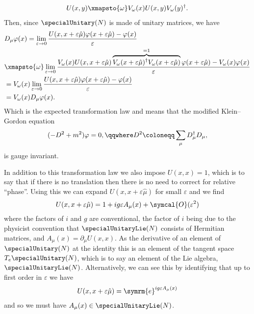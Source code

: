 \documentclass[fleqn]{NotesClass}
\newcommand{\e}{\symrm{e}}
\newcommand{\covariantDerivative}{D}
\newcommand{\hermit}{\dagger}
\newcommand{\order}{\symcal{O}}
\begin{document}
    \begin{equation}
        U(x, y) \xmapsto{\omega} V_\omega(x)U(x, y)V_\omega(y)^\hermit.
    \end{equation}
    Then, since \(\specialUnitary(N)\) is made of unitary matrices, we have
    \begin{align}
        &\covariantDerivative_\mu \varphi(x) = \lim_{\varepsilon \to 0} \frac{U(x, x + \varepsilon\hat{\mu})\varphi(x + \varepsilon\hat{\mu}) - \varphi(x)}{\varepsilon}\\
        &\xmapsto{\omega} \lim_{\varepsilon \to 0} \frac{V_\omega(x)U(x, x + \varepsilon\hat{\mu})\overbrace{V_\omega(x + \varepsilon\hat{\mu})^\hermit V_\omega(x + \varepsilon\hat{\mu})}^{= 1}\varphi(x + \varepsilon\hat{\mu}) - V_\omega(x)\varphi(x)}{\varepsilon} \notag\\
        &= V_\omega(x) \lim_{\varepsilon\to0} \frac{U(x, x + \varepsilon\hat{\mu})\varphi(x + \varepsilon\hat{\mu}) - \varphi(x)}{\varepsilon}\\
        &= V_\omega(x) \covariantDerivative_\mu \varphi(x).
    \end{align}
    Which is the expected transformation law and means that the modified Klein--Gordon equation
    \begin{equation}
        (-\covariantDerivative^2 + m^2) \varphi = 0, \qqwhere \covariantDerivative^2 \coloneqq \sum_\mu \covariantDerivative_\mu^\hermit \covariantDerivative_\mu,
    \end{equation}
    is gauge invariant.
    
    In addition to this transformation law we also impose \(U(x, x) = 1\), which is to say that if there is no translation then there is no need to correct for relative \enquote{phase}.
    Using this we can expand \(U(x, x + \varepsilon\hat{\mu})\) for small \(\varepsilon\) and we find
    \begin{equation}
        U(x, x + \varepsilon\hat{\mu}) = 1 + ig\varepsilon A_\mu(x) + \order(\varepsilon^2)
    \end{equation}
    where the factors of \(i\) and \(g\) are conventional, the factor of \(i\) being due to the physicist convention that \(\specialUnitaryLie(N)\) consists of Hermitian matrices, and \(A_\mu(x) = \partial_\mu U(x, x)\).
    As the derivative of an element of \(\specialUnitary(N)\) at the identity this is an element of the tangent space \(T_e\specialUnitary(N)\), which is to say an element of the Lie algebra, \(\specialUnitaryLie(N)\).
    Alternatively, we can see this by identifying that up to first order in \(\varepsilon\) we have
    \begin{equation}
        U(x, x + \varepsilon\hat{\mu}) = \e^{ig\varepsilon A_\mu(x)}
    \end{equation}
    and so we must have \(A_\mu(x) \in \specialUnitaryLie(N)\).
    
\end{document}
